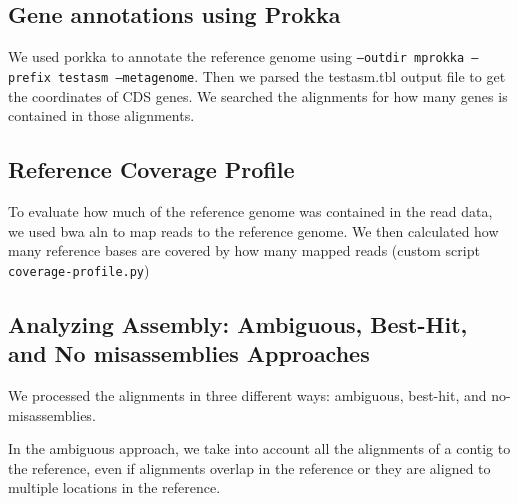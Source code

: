 \documentclass[10pt,a4paper,twocolumn]{article}
\begin{document}
\subsection*{Gene annotations using Prokka}
We used porkka \cite{prokka} to annotate the reference genome using {\tt{--outdir mprokka --prefix testasm --metagenome}}. Then we parsed the testasm.tbl output file to get the coordinates of CDS genes. We searched the alignments for how many genes is contained in those alignments. 

\subsection*{Reference Coverage Profile} 

To evaluate how much of the reference genome was contained in the read
data, we used bwa aln to map reads to the reference genome.
We then calculated how many reference bases are covered by how many mapped reads (custom script {\tt coverage-profile.py})

\subsection*{Analyzing Assembly: Ambiguous, Best-Hit, and No misassemblies Approaches}
We processed the alignments in three different ways: ambiguous, best-hit, and no-misassemblies.





In the ambiguous approach, we take into account all the alignments of a contig to the reference, even if  alignments overlap in the reference or they are  aligned to multiple locations in the reference. 
\end{document}
